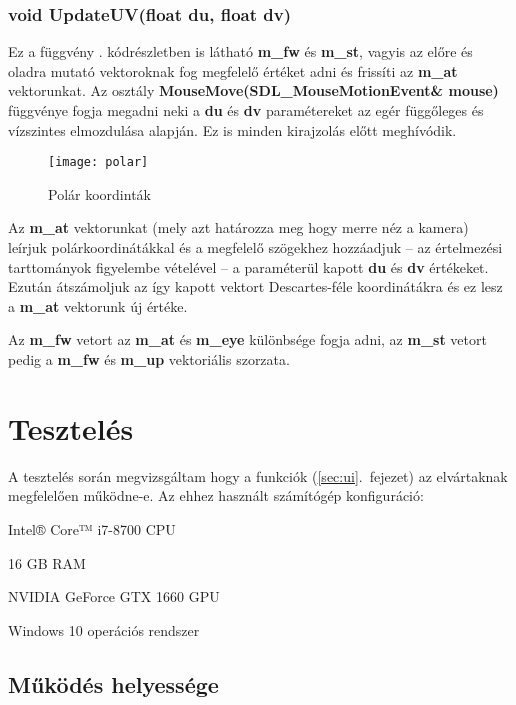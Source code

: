 \subsubsection{void UpdateUV(float du, float dv)}

Ez a függvény . kódrészletben is látható \textbf{m\_fw} és \textbf{m\_st}, vagyis az előre és oladra mutató vektoroknak fog megfelelő értéket adni és frissíti az \textbf{m\_at} vektorunkat. Az osztály \textbf{MouseMove(SDL\_MouseMotionEvent\& mouse)} függvénye fogja megadni neki a \textbf{du} és \textbf{dv} paramétereket az egér függőleges és vízszintes elmozdulása alapján. Ez is minden kirajzolás előtt meghívódik.

\begin{figure}[H]
	\centering
	\texttt{[image: polar]}
	\caption{Polár koordinták \cite{Spherica72:online}}
	\label{fig:polar}
\end{figure}

Az \textbf{m\_at} vektorunkat (mely azt határozza meg hogy merre néz a kamera) leírjuk polárkoordinátákkal és a megfelelő szögekhez hozzáadjuk -- az értelmezési tarttományok figyelembe vételével -- a paraméterül kapott \textbf{du} és \textbf{dv} értékeket. Ezután átszámoljuk az így kapott vektort Descartes-féle koordinátákra és ez lesz a \textbf{m\_at} vektorunk új értéke.

Az \textbf{m\_fw} vetort az \textbf{m\_at} és \textbf{m\_eye} különbsége fogja adni, az \textbf{m\_st} vetort pedig a \textbf{m\_fw} és \textbf{m\_up} vektoriális szorzata.


\section{Tesztelés}

A tesztelés során megvizsgáltam hogy a funkciók (\ref{sec:ui}.~fejezet) az elvártaknak megfelelően működne-e. Az ehhez használt számítógép konfiguráció:
\begin{compactitem}
	\item Intel® Core™ i7-8700 CPU
	\item 16 GB RAM
	\item NVIDIA GeForce GTX 1660 GPU
	\item Windows 10 operációs rendszer
\end{compactitem}

\cleardoublepage
\subsection{Működés helyessége}

